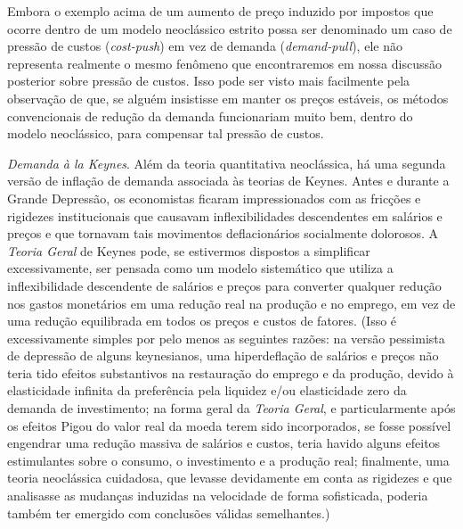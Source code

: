 \documentclass[12pt]{article}
\begin{document}
Embora o exemplo acima de um aumento de preço induzido por impostos que ocorre dentro de um modelo neoclássico estrito possa ser denominado um caso de pressão de custos (\textit{cost-push}) em vez de demanda (\textit{demand-pull}), ele não representa realmente o mesmo fenômeno que encontraremos em nossa discussão posterior sobre pressão de custos. Isso pode ser visto mais facilmente pela observação de que, se alguém insistisse em manter os preços estáveis, os métodos convencionais de redução da demanda funcionariam muito bem, dentro do modelo neoclássico, para compensar tal pressão de custos.

\textit{Demanda à la Keynes}. Além da teoria quantitativa neoclássica, há uma segunda versão de inflação de demanda associada às teorias de Keynes. Antes e durante a Grande Depressão, os economistas ficaram impressionados com as fricções e rigidezes institucionais que causavam inflexibilidades descendentes em salários e preços e que tornavam tais movimentos deflacionários socialmente dolorosos. A \textit{Teoria Geral} de Keynes pode, se estivermos dispostos a simplificar excessivamente, ser pensada como um modelo sistemático que utiliza a inflexibilidade descendente de salários e preços para converter qualquer redução nos gastos monetários em uma redução real na produção e no emprego, em vez de uma redução equilibrada em todos os preços e custos de fatores. (Isso é excessivamente simples por pelo menos as seguintes razões: na versão pessimista de depressão de alguns keynesianos, uma hiperdeflação de salários e preços não teria tido efeitos substantivos na restauração do emprego e da produção, devido à elasticidade infinita da preferência pela liquidez e/ou elasticidade zero da demanda de investimento; na forma geral da \textit{Teoria Geral}, e particularmente após os efeitos Pigou do valor real da moeda terem sido incorporados, se fosse possível engendrar uma redução massiva de salários e custos, teria havido alguns efeitos estimulantes sobre o consumo, o investimento e a produção real; finalmente, uma teoria neoclássica cuidadosa, que levasse devidamente em conta as rigidezes e que analisasse as mudanças induzidas na velocidade de forma sofisticada, poderia também ter emergido com conclusões válidas semelhantes.)
\end{document}

